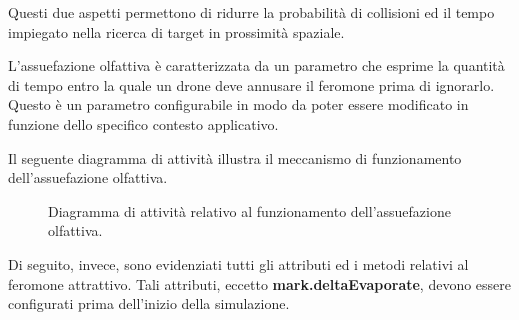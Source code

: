 Questi due aspetti permettono di ridurre la probabilità di collisioni ed il tempo impiegato nella ricerca di target in prossimità spaziale. 

L’assuefazione olfattiva è caratterizzata da un parametro che esprime la quantità di tempo entro la quale un drone deve annusare il feromone prima di ignorarlo. 
Questo è un parametro configurabile in modo da poter essere modificato in funzione dello specifico contesto applicativo. 

Il seguente diagramma di attività illustra il meccanismo di funzionamento dell’assuefazione olfattiva.

\begin{figure}[H] 
    \captionsetup{justification=centering, margin=2cm, font=footnotesize}
    \begin{center}
    \end{center}
    \caption[short]{Diagramma di attività relativo al funzionamento dell'assuefazione olfattiva.}
    \label{activity_assuefazione}
\end{figure}

Di seguito, invece, sono evidenziati tutti gli attributi ed i metodi relativi al feromone attrattivo.
Tali attributi, eccetto \textbf{mark.deltaEvaporate}, devono essere configurati prima dell'inizio della simulazione.

